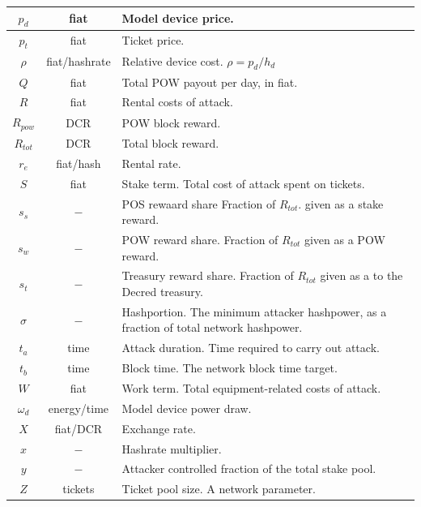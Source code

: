\documentclass[a4paper,12pt]{article}
\begin{document}
\begin{appendices}
\begin{center}
\begin{tabular}{ | c | c | l | }
	$ p_d $ & fiat & Model device price. \\ \hline
	$ p_t $ & fiat & Ticket price. \\ \hline
	$ \rho $ & fiat/hashrate & Relative device cost. $\rho = p_d / h_d$ \\ \hline
	$ Q $ & fiat & Total POW payout per day, in fiat. \\ \hline
	$ R $ & fiat & Rental costs of attack. \\ \hline
	$ R_{pow} $ & DCR & POW block reward. \\ \hline
	$ R_{tot} $ & DCR & Total block reward. \\ \hline
	$ r_e $ & fiat/hash & Rental rate. \\ \hline
	$ S $ & fiat & Stake term. Total cost of attack spent on tickets. \\ \hline
	$ s_s $ & $ - $ & \makecell[l]{POS rewaard share Fraction of $R_{tot}$. given as a \\stake reward. }\\ \hline
	$ s_w $ & $ - $ & \makecell[l]{ POW reward share. Fraction of $R_{tot} $ given as a \\POW reward. }\\ \hline
	$ s_t $ & $ - $ & \makecell[l]{ Treasury reward share. Fraction of $R_{tot} $ given as a \\to the Decred treasury. }\\ \hline
	$ \sigma $ & $ - $ & \makecell[l]{ Hashportion. The minimum attacker hashpower, as a \\fraction of total network hashpower.} \\ \hline
	$ t_a $ & time & Attack duration. Time required to carry out attack. \\ \hline
	$ t_b $ & time & Block time. The network block time target. \\ \hline
	$ W $ & fiat & Work term. Total equipment-related costs of attack. \\ \hline
	$ \omega_d $ & energy/time & Model device power draw. \\ \hline
	$ X $ & fiat/DCR & Exchange rate. \\ \hline
	$ x $ & $ - $ & Hashrate multiplier. \\ \hline
	$ y $ & $ - $ & Attacker controlled fraction of the total stake pool. \\ \hline
	$ Z $ & tickets & Ticket pool size. A network parameter. \\ \hline
  \end{tabular}
\end{center}




\end{appendices}
\end{document}
